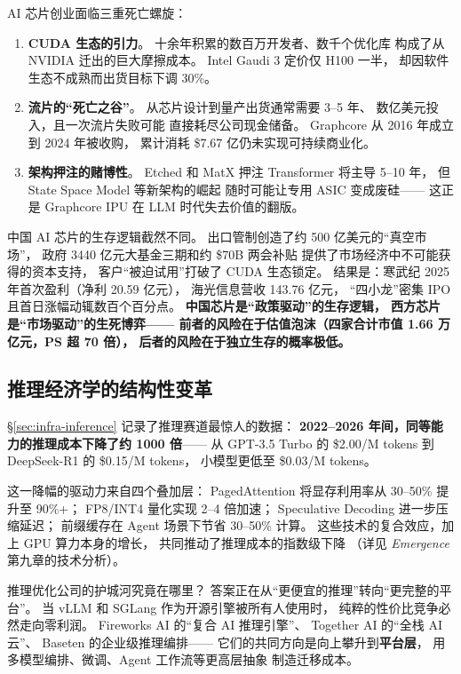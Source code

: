 \begin{warnbox}
AI 芯片创业面临三重死亡螺旋：
\begin{enumerate}[noitemsep]
  \item \textbf{CUDA 生态的引力}。
        十余年积累的数百万开发者、数千个优化库
        构成了从 NVIDIA 迁出的巨大摩擦成本。
        Intel Gaudi 3 定价仅 H100 一半，
        却因软件生态不成熟而出货目标下调 30\%。
  \item \textbf{流片的``死亡之谷''}。
        从芯片设计到量产出货通常需要 3--5 年、
        数亿美元投入，且一次流片失败可能
        直接耗尽公司现金储备。
        Graphcore 从 2016 年成立到 2024 年被收购，
        累计消耗 \$7.67 亿仍未实现可持续商业化。
  \item \textbf{架构押注的赌博性}。
        Etched 和 MatX 押注 Transformer 将主导 5--10 年，
        但 State Space Model 等新架构的崛起
        随时可能让专用 ASIC 变成废硅——
        这正是 Graphcore IPU 在 LLM 时代失去价值的翻版。
\end{enumerate}
\end{warnbox}

中国 AI 芯片的生存逻辑截然不同。
出口管制创造了约 500 亿美元的``真空市场''，
政府 3440 亿元大基金三期和约 \$70B 两会补贴
提供了市场经济中不可能获得的资本支持，
客户``被迫试用''打破了 CUDA 生态锁定。
结果是：寒武纪 2025 年首次盈利（净利 20.59 亿元），
海光信息营收 143.76 亿元，
``四小龙''密集 IPO 且首日涨幅动辄数百个百分点。
\textbf{中国芯片是``政策驱动''的生存逻辑，
西方芯片是``市场驱动''的生死博弈——
前者的风险在于估值泡沫（四家合计市值 1.66 万亿元，PS 超 70 倍），
后者的风险在于独立生存的概率极低。}

\subsection{推理经济学的结构性变革}

\S\ref{sec:infra-inference} 记录了推理赛道最惊人的数据：
\textbf{2022--2026 年间，同等能力的推理成本下降了约 1000 倍}——
从 GPT-3.5 Turbo 的 \$2.00/M tokens
到 DeepSeek-R1 的 \$0.15/M tokens，
小模型更低至 \$0.03/M tokens。

这一降幅的驱动力来自四个叠加层：
PagedAttention 将显存利用率从 30--50\% 提升至 90\%+；
FP8/INT4 量化实现 2--4 倍加速；
Speculative Decoding 进一步压缩延迟；
前缀缓存在 Agent 场景下节省 30--50\% 计算。
这些技术的复合效应，加上 GPU 算力本身的增长，
共同推动了推理成本的指数级下降
（详见 \textit{Emergence} 第九章的技术分析）。

推理优化公司的护城河究竟在哪里？
答案正在从``更便宜的推理''转向``更完整的平台''。
当 vLLM 和 SGLang 作为开源引擎被所有人使用时，
纯粹的性价比竞争必然走向零利润。
Fireworks AI 的``复合 AI 推理引擎''、
Together AI 的``全栈 AI 云''、
Baseten 的企业级推理编排——
它们的共同方向是向上攀升到\textbf{平台层}，
用多模型编排、微调、Agent 工作流等更高层抽象
制造迁移成本。

